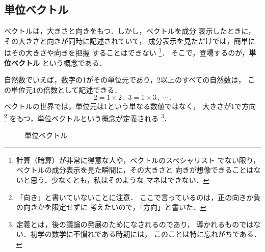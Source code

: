 ﻿%
            \subsection{単位ベクトル}
                ベクトルは，大きさと向きをもつ．しかし，ベクトルを成分
                表示したときに，その大きさと向きが同時に記述されていて，
                成分表示を見ただけでは，簡単にはその大きさや向きを把握
                することはできない
                    \footnote{
                        計算（暗算）が非常に得意な人や，ベクトルのスペシャリスト
                        でない限り，ベクトルの成分表示を見た瞬間に，その大きさと
                        向きが想像できることはないと思う．少なくとも，私はそのような
                        マネはできない．
                    }．
                そこで，登場するのが，\textbf{単位ベクトル} という概念である．

                自然数でいえば，数字の1がその単位元であり，2以上のすべての自然数は，
                この単位元1の倍数として記述できる．
                    \begin{equation*}
                        2 = 1 \times 2\,,\;3 = 1 \times 3\,,\;\cdots\,.
                    \end{equation*}
                ベクトルの世界では，単位元は1という単なる数値ではなく，
                大きさが1で方向
                    \footnote{
                        「向き」と書いていないことに注意．
                        ここで言っているのは，正の向きか負の向きかを限定せずに
                        考えたいので，「方向」と書いた．
                    }
                をもつ，単位ベクトルという概念が定義される
                    \footnote{
                        定義とは，後の議論の発展のためになされるのであり，
                        導かれるものではない．初学の数学に不慣れである時期には，
                        このことは特に忘れがちである．
                    }．
                    \begin{figure}[hbt]
                        \begin{center}
                            \caption{単位ベクトル}
                            \label{fig:TaniVector00}
                        \end{center}
                    \end{figure}

